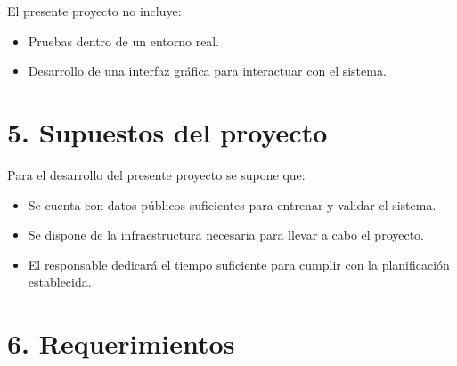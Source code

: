 \documentclass[
11pt, %
]{charter}
\begin{document}
El presente proyecto no incluye:
\begin{itemize}
	\item Pruebas dentro de un entorno real.
	\item Desarrollo de una interfaz gráfica para interactuar con el sistema.

\end{itemize}

\section{5. Supuestos del proyecto}
\label{sec:supuestos}

Para el desarrollo del presente proyecto se supone que:

\begin{itemize}
	\item Se cuenta con datos públicos suficientes para entrenar y validar el sistema.
	\item Se dispone de la infraestructura necesaria para llevar a cabo el proyecto.
	\item El responsable dedicará el tiempo suficiente para cumplir con la planificación establecida.
\end{itemize}


\section{6. Requerimientos}
\label{sec:requerimientos}
\end{document}
